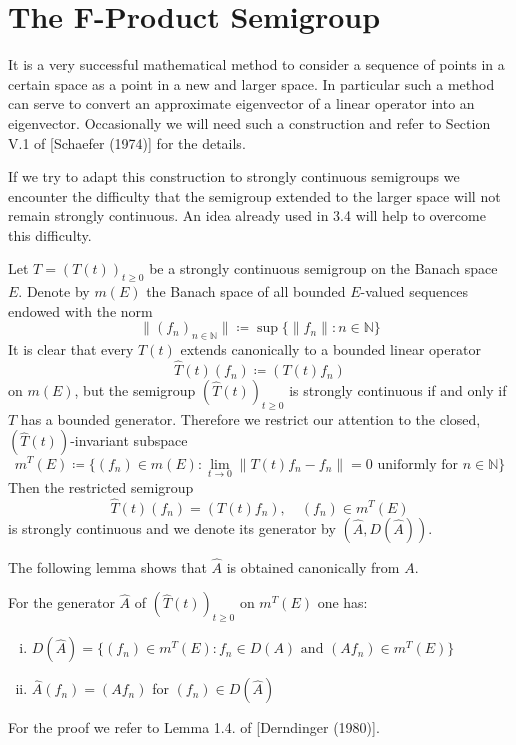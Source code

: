 \section{The F-Product Semigroup}\label{sec:a1-3.6}
It is a very successful mathematical method to consider a sequence of points in a certain space as a point in a new and larger space.
In particular such a method can serve to convert an approximate eigenvector of a linear operator into an eigenvector.
Occasionally we will need such a construction and refer to Section V.1 of [Schaefer (1974)] for the details.

If we try to adapt this construction to strongly continuous semigroups we encounter the difficulty that the semigroup extended to the larger space will not remain strongly continuous.
An idea already used in 3.4 will help to overcome this difficulty.

Let $T = (T(t))_{t \geq 0}$ be a strongly continuous semigroup on the Banach space $E$.
Denote by $m(E)$ the Banach space of all bounded $E$-valued sequences endowed with the norm
\[
    \|(f_{n})_{n \in \mathbb{N}}\| \coloneqq \sup \{\|f_{n}\| : n \in \mathbb{N}\}
\]
It is clear that every $T(t)$ extends canonically to a bounded linear operator
\[
    \hat{T}(t)(f_{n}) \coloneqq (T(t)f_{n})
\]
on $m(E)$, but the semigroup $(\hat{T}(t))_{t \geq 0}$ is strongly continuous if and only if $T$ has a bounded generator.
Therefore we restrict our attention to the closed, $(\hat{T}(t))$-invariant subspace
\[
    m^{T}(E) \coloneqq \{(f_{n}) \in m(E) : \lim_{t \to 0} \|T(t)f_{n}-f_{n}\| = 0 \text{ uniformly for } n \in \mathbb{N}\}
\]
Then the restricted semigroup
\[
    \hat{T}(t)(f_{n}) = (T(t)f_{n}), \quad (f_{n}) \in m^{T}(E)
\]
is strongly continuous and we denote its generator by $(\hat{A},D(\hat{A}))$.

The following lemma shows that $\hat{A}$ is obtained canonically from $A$.
\begin{lemma}\label{lem:a1-3.6}
For the generator $\hat{A}$ of $(\hat{T}(t))_{t \geq 0}$ on $m^{T}(E)$ one has:
\begin{enumerate}[(i)]

\item 
$D(\hat{A}) = \{(f_{n}) \in m^{T}(E) : f_{n} \in D(A) \text{ and } (Af_{n}) \in m^{T}(E)\}$

\item 
$\hat{A}(f_{n}) = (Af_{n})$ for $(f_{n}) \in D(\hat{A})$
\end{enumerate}

\end{lemma}
For the proof we refer to Lemma 1.4. of [Derndinger (1980)].

